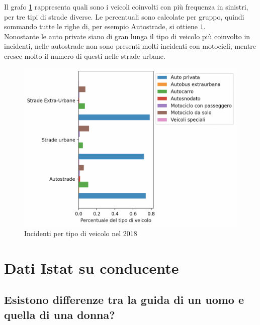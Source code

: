 \documentclass[a4paper]{report}
\begin{document}
Il grafo \ref{fig:differenza-strade} rappresenta quali sono i veicoli coinvolti con più frequenza 
in sinistri, per tre tipi di strade diverse. Le percentuali sono calcolate per gruppo, quindi sommando 
tutte le righe di, per esempio Autostrade, si ottiene $1$.\\
Nonostante le auto private siano di gran lunga il tipo di veicolo 
più coinvolto in incidenti, nelle autostrade non sono presenti molti incidenti con motocicli, 
mentre cresce molto il numero di questi nelle strade urbane.

\begin{figure}
    \includegraphics[width=\linewidth]{../src/incidenti/incidenti_senza_coords/tipo_veicoli/differenza_strade.png}
    \caption{Incidenti per tipo di veicolo nel 2018}
    \label{fig:differenza-strade}
\end{figure}

\section{Dati Istat su conducente}

\subsection{Esistono differenze tra la guida di un uomo e quella di una donna?}
\end{document}
